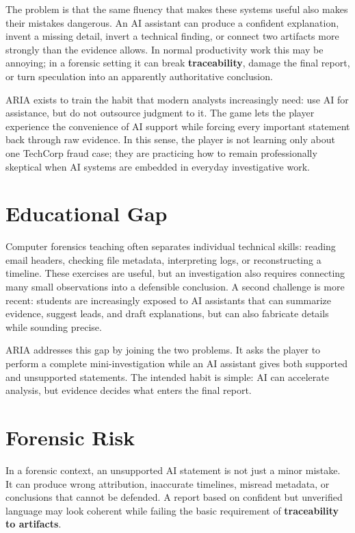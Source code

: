 The problem is that the same fluency that makes these systems useful also makes their mistakes dangerous. An AI assistant can produce a confident explanation, invent a missing detail, invert a technical finding, or connect two artifacts more strongly than the evidence allows. In normal productivity work this may be annoying; in a forensic setting it can break \textbf{traceability}, damage the final report, or turn speculation into an apparently authoritative conclusion.

ARIA exists to train the habit that modern analysts increasingly need: use AI for assistance, but do not outsource judgment to it. The game lets the player experience the convenience of AI support while forcing every important statement back through raw evidence. In this sense, the player is not learning only about one TechCorp fraud case; they are practicing how to remain professionally skeptical when AI systems are embedded in everyday investigative work.

\section{Educational Gap}

Computer forensics teaching often separates individual technical skills: reading email headers, checking file metadata, interpreting logs, or reconstructing a timeline. These exercises are useful, but an investigation also requires connecting many small observations into a defensible conclusion. A second challenge is more recent: students are increasingly exposed to AI assistants that can summarize evidence, suggest leads, and draft explanations, but can also fabricate details while sounding precise.

ARIA addresses this gap by joining the two problems. It asks the player to perform a complete mini-investigation while an AI assistant gives both supported and unsupported statements. The intended habit is simple: AI can accelerate analysis, but evidence decides what enters the final report.

\section{Forensic Risk}

In a forensic context, an unsupported AI statement is not just a minor mistake. It can produce wrong attribution, inaccurate timelines, misread metadata, or conclusions that cannot be defended. A report based on confident but unverified language may look coherent while failing the basic requirement of \textbf{traceability to artifacts}.

